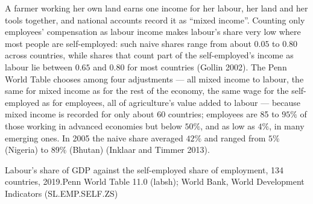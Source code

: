 \begin{measure}
A farmer working her own land earns one income for her labour, her land
and her tools together, and national accounts record it as ``mixed
income''. Counting only employees' compensation as labour income makes
labour's share very low where most people are self-employed: such naive
shares range from about $0.05$ to $0.80$ across countries, while shares that
count part of the self-employed's income as labour lie between $0.65$ and $0.80$
for most countries (Gollin 2002). %
The Penn World Table chooses among four adjustments --- all mixed income
to labour, the same  for mixed income as for the rest of the
economy, the same wage for the self-employed as for employees, all of
agriculture's value added to labour --- because mixed income is recorded
for only about 60 countries; employees are 85 to $95\%$ of those working in
advanced economies but below $50\%$, and as low as $4\%$, in many emerging ones.
In 2005 the naive share averaged $42\%$ and ranged from $5\%$ (Nigeria) to $89\%$
(Bhutan) (Inklaar and Timmer 2013). %
\end{measure}

\begin{omchart}{Labour's share of GDP against the self-employed share of
employment, 134 countries, 2019.}{Penn World Table 11.0 (labsh); World
Bank, World Development Indicators (SL.EMP.SELF.ZS)}
\end{omchart}

